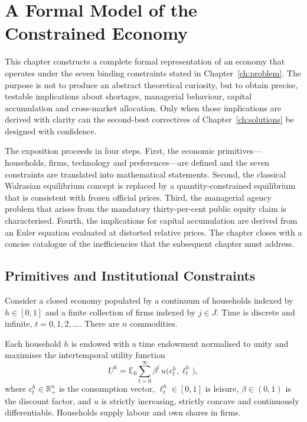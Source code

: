 \documentclass[12pt,anyside]{book}
\theoremstyle{definition}
\theoremstyle{plain}
\theoremstyle{remark}
\begin{document}
\chapter{A Formal Model of the Constrained Economy}
\label{ch:model}

This chapter constructs a complete formal representation of an economy that operates under the seven binding constraints stated in Chapter~\ref{ch:problem}. The purpose is not to produce an abstract theoretical curiosity, but to obtain precise, testable implications about shortages, managerial behaviour, capital accumulation and cross-market allocation. Only when those implications are derived with clarity can the second-best correctives of Chapter~\ref{ch:solutions} be designed with confidence.

The exposition proceeds in four steps. First, the economic primitives—households, firms, technology and preferences—are defined and the seven constraints are translated into mathematical statements. Second, the classical Walrasian equilibrium concept is replaced by a quantity-constrained equilibrium that is consistent with frozen official prices. Third, the managerial agency problem that arises from the mandatory thirty-per-cent public equity claim is characterised. Fourth, the implications for capital accumulation are derived from an Euler equation evaluated at distorted relative prices. The chapter closes with a concise catalogue of the inefficiencies that the subsequent chapter must address.

\section{Primitives and Institutional Constraints}

Consider a closed economy populated by a continuum of households indexed by $h\in[0,1]$ and a finite collection of firms indexed by $j\in J$. Time is discrete and infinite, $t=0,1,2,\ldots$. There are $n$ commodities.

Each household $h$ is endowed with a time endowment normalised to unity and maximises the intertemporal utility function
\begin{equation}
U^h=\mathbb{E}_0\sum_{t=0}^\infty\beta^t\,u\bigl(c_t^h,\ell_t^h\bigr),
\end{equation}
where $c_t^h\in\mathbb{R}_+^n$ is the consumption vector, $\ell_t^h\in[0,1]$ is leisure, $\beta\in(0,1)$ is the discount factor, and $u$ is strictly increasing, strictly concave and continuously differentiable. Households supply labour and own shares in firms.
\end{document}

